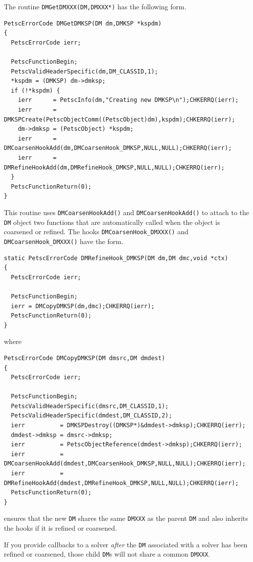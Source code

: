 The routine \lstinline{DMGetDMXXX(DM,DMXXX*)} has the following form.
\begin{lstlisting}
PetscErrorCode DMGetDMKSP(DM dm,DMKSP *kspdm)
{
  PetscErrorCode ierr;

  PetscFunctionBegin;
  PetscValidHeaderSpecific(dm,DM_CLASSID,1);
  *kspdm = (DMKSP) dm->dmksp;
  if (!*kspdm) {
    ierr      = PetscInfo(dm,"Creating new DMKSP\n");CHKERRQ(ierr);
    ierr      = DMKSPCreate(PetscObjectComm((PetscObject)dm),kspdm);CHKERRQ(ierr);
    dm->dmksp = (PetscObject) *kspdm;
    ierr      = DMCoarsenHookAdd(dm,DMCoarsenHook_DMKSP,NULL,NULL);CHKERRQ(ierr);
    ierr      = DMRefineHookAdd(dm,DMRefineHook_DMKSP,NULL,NULL);CHKERRQ(ierr);
  }
  PetscFunctionReturn(0);
}
\end{lstlisting}
This routine uses \lstinline{DMCoarsenHookAdd()} and \lstinline{DMCoarsenHookAdd()} to attach to the \lstinline{DM} object two functions that are automatically called when the object is coarsened or refined.
The hooks \lstinline{DMCoarsenHook_DMXXX()} and \lstinline{DMCoarsenHook_DMXXX()} have the form.
\begin{lstlisting}
static PetscErrorCode DMRefineHook_DMKSP(DM dm,DM dmc,void *ctx)
{
  PetscErrorCode ierr;

  PetscFunctionBegin;
  ierr = DMCopyDMKSP(dm,dmc);CHKERRQ(ierr);
  PetscFunctionReturn(0);
}
\end{lstlisting}
where
\begin{lstlisting}
PetscErrorCode DMCopyDMKSP(DM dmsrc,DM dmdest)
{
  PetscErrorCode ierr;

  PetscFunctionBegin;
  PetscValidHeaderSpecific(dmsrc,DM_CLASSID,1);
  PetscValidHeaderSpecific(dmdest,DM_CLASSID,2);
  ierr          = DMKSPDestroy((DMKSP*)&dmdest->dmksp);CHKERRQ(ierr);
  dmdest->dmksp = dmsrc->dmksp;
  ierr          = PetscObjectReference(dmdest->dmksp);CHKERRQ(ierr);
  ierr          = DMCoarsenHookAdd(dmdest,DMCoarsenHook_DMKSP,NULL,NULL);CHKERRQ(ierr);
  ierr          = DMRefineHookAdd(dmdest,DMRefineHook_DMKSP,NULL,NULL);CHKERRQ(ierr);
  PetscFunctionReturn(0);
}
\end{lstlisting}
ensures that the new \lstinline{DM} shares the same \lstinline{DMXXX} as the parent \lstinline{DM} and also inherits the hooks if it is refined or coarsened.

If you provide callbacks to a solver {\em after} the \lstinline{DM} associated with a solver has been refined or coarsened,
those child \lstinline{DM}s will not share a common \lstinline{DMXXX}.

